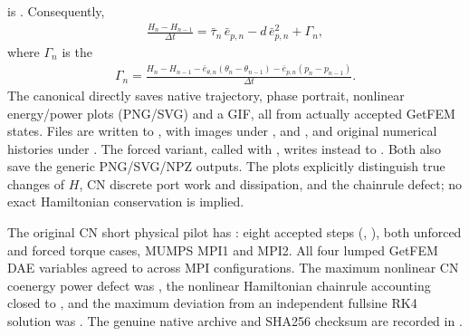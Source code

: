 \documentclass[letterpaper,10pt,english]{sphinxmanual}
\begin{document}
is . Consequently,
\begin{equation*}
\begin{split}\frac{H_n-H_{n-1}}{\Delta t}
=\bar\tau_n\,\bar e_{p,n}
 -d\,\bar e_{p,n}^{2}
 +\Gamma_n,\end{split}
\end{equation*}
\sphinxAtStartPar
where \(\Gamma_n\) is the 
\begin{equation*}
\begin{split}\Gamma_n=
   \frac{H_n-H_{n-1}
   -\bar e_{\theta,n}(\theta_n-\theta_{n-1})
   -\bar e_{p,n}(p_n-p_{n-1})}{\Delta t}.\end{split}
\end{equation*}
\sphinxAtStartPar
The canonical  directly
saves native trajectory, phase portrait, nonlinear energy/power
plots (PNG/SVG) and a  GIF, all from actually
accepted GetFEM states. Files are written to
,
with images under ,  and ,
and original numerical histories under .
The forced variant, called with ,
writes instead to .
Both also save the generic 
PNG/SVG/NPZ outputs.
The plots explicitly distinguish true changes of \(H\),
CN discrete port work and dissipation, and the chain\sphinxhyphen{}rule
defect; no exact Hamiltonian conservation is implied.

\sphinxAtStartPar
The original CN short physical pilot has :
eight accepted steps (, ), both
unforced and forced torque cases, MUMPS MPI1 and MPI2.
All four lumped GetFEM DAE variables agreed to
 across MPI configurations. The maximum
nonlinear CN co\sphinxhyphen{}energy power defect was ,
the nonlinear Hamiltonian chain\sphinxhyphen{}rule accounting closed
to , and the maximum deviation from an
independent full\sphinxhyphen{}sine RK4 solution was .
The genuine native archive and SHA256 checksum are
recorded in .
\end{document}
